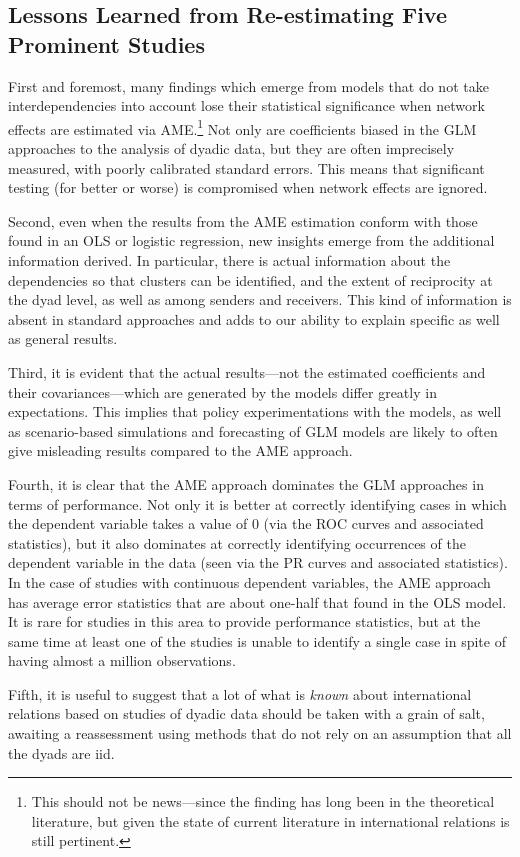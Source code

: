 \subsection{Lessons Learned from Re-estimating Five Prominent Studies}

First and foremost, many findings which emerge from models that do not take interdependencies into account lose their statistical significance when network effects are estimated via AME.\footnote{This should not be news---since the finding has long been in the theoretical literature, but given the state of current literature in international relations is still pertinent.} Not only are coefficients biased in the GLM approaches to the analysis of dyadic data, but they are often imprecisely measured, with poorly calibrated standard errors.  This means that significant testing (for better or worse) is compromised when network effects are ignored.

Second, even when the results from the AME estimation conform with those found in an OLS or logistic regression, new insights emerge from the additional information derived. In particular, there is actual information about the dependencies so that clusters can be identified, and the extent of reciprocity at the dyad level, as well as among senders and receivers.  This kind of information is absent in standard approaches and adds to our ability to explain specific as well as general results.

Third, it is evident that the actual results---not the estimated coefficients and their covariances---which are generated by the models differ greatly in expectations.  This implies that policy experimentations with the models, as well as scenario-based simulations and forecasting of GLM models are likely to often give misleading results compared to the AME approach.

Fourth, it is clear that the AME approach dominates the GLM approaches in terms of performance. Not only it is better at correctly identifying cases in which the dependent variable takes a value of $0$ (via the ROC curves and associated statistics), but it also dominates at correctly identifying occurrences of the dependent variable in the data (seen via the PR curves and associated statistics).  In the case of studies with continuous dependent variables, the AME approach has average error statistics that are about one-half that found in the OLS model. It is rare for studies in this area to provide performance statistics, but at the same time at least one of the studies is unable to identify a single case in spite of having almost a million observations.

Fifth, it is useful to suggest that a lot of what is \textit{known} about international relations based on studies of dyadic data should be taken with a grain of salt, awaiting a reassessment using methods that do not rely on an assumption that all the dyads are iid.